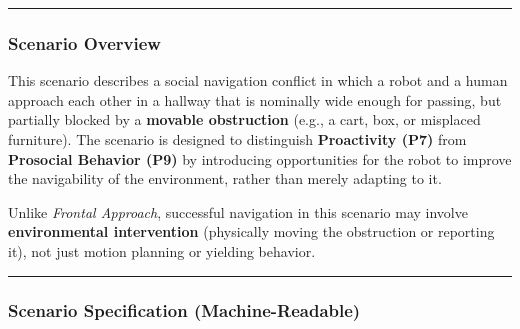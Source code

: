 \documentclass[utf8]{frontiers_suppmat} %
\begin{document}
\begin{center}\rule{0.5\linewidth}{0.5pt}\end{center}

\subsubsection{Scenario Overview}\label{scenario-overview}

This scenario describes a social navigation conflict in which a robot
and a human approach each other in a hallway that is nominally wide
enough for passing, but partially blocked by a \textbf{movable
obstruction} (e.g., a cart, box, or misplaced furniture). The scenario
is designed to distinguish \textbf{Proactivity (P7)} from
\textbf{Prosocial Behavior (P9)} by introducing opportunities for the
robot to improve the navigability of the environment, rather than merely
adapting to it.

Unlike \emph{Frontal Approach}, successful navigation in this scenario
may involve \textbf{environmental intervention} (physically moving the
obstruction or reporting it), not just motion planning or yielding
behavior.

\begin{center}\rule{0.5\linewidth}{0.5pt}\end{center}

\subsubsection{Scenario Specification
(Machine-Readable)}\label{scenario-specification-machine-readable}
\end{document}
